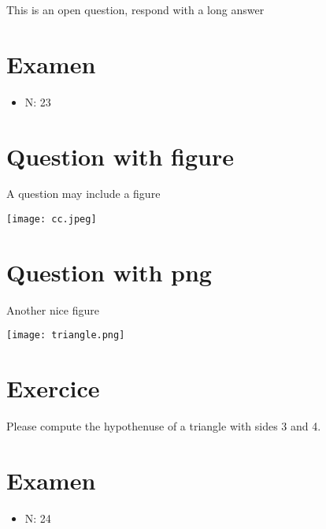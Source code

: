 \documentclass[a4paper,11pt,twoside]{article}
\begin{document}
This is an open question, respond with a long answer


\subsection*{}
\label{sec:orgf9b2cc2}

\cleardoublepage

\section*{Examen}
\label{sec:orgb1b3f8a}
\begin{itemize}
\item N: 23
\end{itemize}
\section*{Question with figure}
\label{sec:org081707a}


A question may include a figure

\begin{center}
\texttt{[image: cc.jpeg]}
\end{center}



\section*{Question with png}
\label{sec:org7992ce0}

Another nice figure

\begin{center}
\texttt{[image: triangle.png]}
\end{center}



\section*{Exercice}
\label{sec:org63861fd}

Please compute the hypothenuse of a triangle with sides 3 and 4.



\subsection*{}
\label{sec:org3030071}

\cleardoublepage

\section*{Examen}
\label{sec:orgb7e0c6f}
\begin{itemize}
\item N: 24
\end{itemize}
\end{document}
